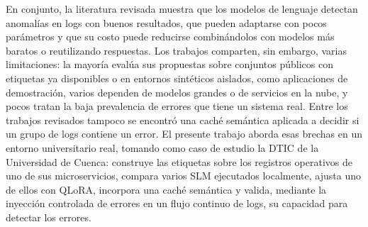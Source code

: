 En conjunto, la literatura revisada muestra que los modelos de lenguaje detectan anomalías en logs con buenos resultados, que pueden adaptarse con pocos parámetros y que su costo puede reducirse combinándolos con modelos más baratos o reutilizando respuestas. Los trabajos comparten, sin embargo, varias limitaciones: la mayoría evalúa sus propuestas sobre conjuntos públicos con etiquetas ya disponibles o en entornos sintéticos aislados, como aplicaciones de demostración, varios dependen de modelos grandes o de servicios en la nube, y pocos tratan la baja prevalencia de errores que tiene un sistema real. Entre los trabajos revisados tampoco se encontró una caché semántica aplicada a decidir si un grupo de logs contiene un error. El presente trabajo aborda esas brechas en un entorno universitario real, tomando como caso de estudio la DTIC de la Universidad de Cuenca: construye las etiquetas sobre los registros operativos de uno de sus microservicios, compara varios SLM ejecutados localmente, ajusta uno de ellos con QLoRA, incorpora una caché semántica y valida, mediante la inyección controlada de errores en un flujo continuo de logs, su capacidad para detectar los errores.
